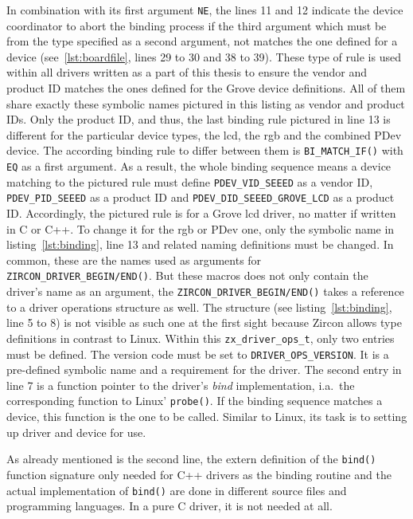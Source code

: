 %
In combination with its first argument \texttt{NE}, the lines 11 and 12 indicate the device coordinator to abort the binding process if the third argument which must be from the type specified as a second argument, not matches the one defined for a device (see~\ref{lst:boardfile}, lines 29 to 30 and 38 to 39).
These type of rule is used within all drivers written as a part of this thesis to ensure the vendor and product ID matches the ones defined for the Grove device definitions.
All of them share exactly these symbolic names pictured in this listing as vendor and product IDs.
Only the product ID, and thus, the last binding rule pictured in line 13 is different for the particular device types, the \ac{lcd}, the \ac{rgb} and the combined PDev device.
The according binding rule to differ between them is \texttt{BI_MATCH_IF()} with \texttt{EQ} as a first argument.
As a result, the whole binding sequence means a device matching to the pictured rule must define \texttt{PDEV\_VID\_SEEED} as a vendor ID, \texttt{PDEV\_PID\_SEEED} as a product ID and \texttt{PDEV\_DID\_SEEED\_GROVE\_LCD} as a product ID.
Accordingly, the pictured rule is for a Grove \ac{lcd} driver, no matter if written in C or C++.
To change it for the \ac{rgb} or PDev one, only the symbolic name in listing~\ref{lst:binding}, line 13 and related naming definitions must be changed.
In common, these are the names used as arguments for \texttt{ZIRCON_DRIVER_BEGIN/END()}.
But these macros does not only contain the driver's name as an argument, the \texttt{ZIRCON_DRIVER_BEGIN/END()} takes a reference to a driver operations structure as well.
The structure (see listing~\ref{lst:binding}, line 5 to 8) is not visible as such one at the first sight because Zircon allows type definitions in contrast to Linux.
Within this \texttt{zx_driver_ops_t}, only two entries must be defined.
The version code must be set to \texttt{DRIVER_OPS_VERSION}.
It is a pre-defined symbolic name and a requirement for the driver.
The second entry in line 7 is a function pointer to the driver's \textit{bind} implementation, i.a.\ the corresponding function to Linux' \texttt{probe()}.
If the binding sequence matches a device, this function is the one to be called.
Similar to Linux, its task is to setting up driver and device for use.

As already mentioned is the second line, the extern definition of the \texttt{bind()} function signature only needed for C++ drivers as the binding routine and the actual implementation of  \texttt{bind()} are done in different source files and programming languages.
In a pure C driver, it is not needed at all.

